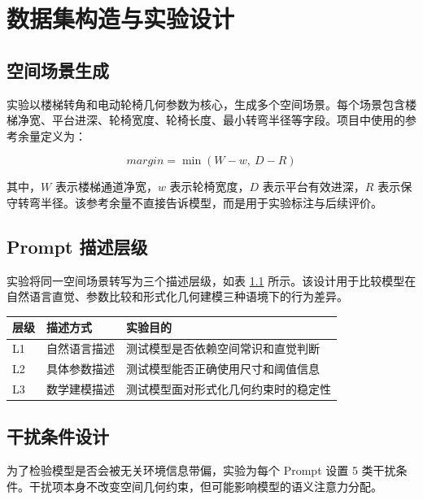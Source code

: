 
\chapter{数据集构造与实验设计}

\section{空间场景生成}

实验以楼梯转角和电动轮椅几何参数为核心，生成多个空间场景。每个场景包含楼梯净宽、平台进深、轮椅宽度、轮椅长度、最小转弯半径等字段。项目中使用的参考余量定义为：

\begin{equation}
margin = \min(W - w,\ D - R)
\label{eq:margin}
\end{equation}

其中，$W$ 表示楼梯通道净宽，$w$ 表示轮椅宽度，$D$ 表示平台有效进深，$R$ 表示保守转弯半径。该参考余量不直接告诉模型，而是用于实验标注与后续评价。

\section{Prompt 描述层级}

实验将同一空间场景转写为三个描述层级，如表 \ref{tab:levels} 所示。该设计用于比较模型在自然语言直觉、参数比较和形式化几何建模三种语境下的行为差异。

\begin{table}[htbp]
    \centering
    \begin{tabular}{lll}
        \toprule
        层级 & 描述方式 & 实验目的 \\
        \midrule
        L1 & 自然语言描述 & 测试模型是否依赖空间常识和直觉判断 \\
        L2 & 具体参数描述 & 测试模型能否正确使用尺寸和阈值信息 \\
        L3 & 数学建模描述 & 测试模型面对形式化几何约束时的稳定性 \\
        \bottomrule
    \end{tabular}
    \label{tab:levels}
\end{table}

\section{干扰条件设计}

为了检验模型是否会被无关环境信息带偏，实验为每个 Prompt 设置 5 类干扰条件。干扰项本身不改变空间几何约束，但可能影响模型的语义注意力分配。

